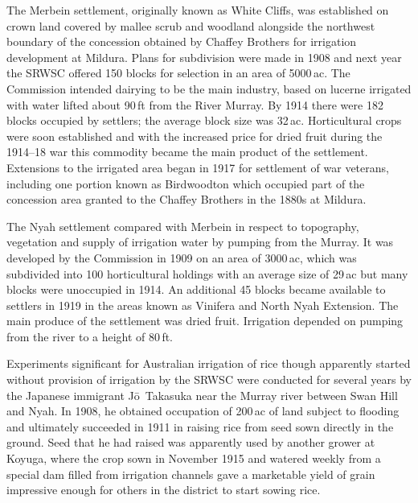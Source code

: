 The Merbein settlement, originally known as White Cliffs, was
established on crown land covered by mallee scrub and woodland
alongside the northwest boundary of the concession obtained by Chaffey
Brothers for irrigation development at Mildura.  Plans for subdivision
were made in 1908 and next year the SRWSC offered 150 blocks for
selection in an area of 5000\,ac.  The Commission intended dairying to
be the main industry, based on lucerne irrigated with water lifted
about 90\,ft from the River Murray.  By 1914 there were 182 blocks
occupied by settlers; the average block size was 32\,ac.
Horticultural crops were soon established and with the increased price
for dried fruit during the 1914--18 war this commodity became the main
product of the settlement.  Extensions to the irrigated area began in
1917 for settlement of war veterans, including one portion known as
Birdwoodton which occupied part of the concession area granted to the
Chaffey Brothers in the 1880s at Mildura.

The Nyah settlement compared with Merbein in respect to topography,
vegetation and supply of irrigation water by pumping from the Murray.
It was developed by the Commission in 1909 on an area of 3000\,ac,
which was subdivided into 100 horticultural holdings with an average
size of 29\,ac but many blocks were unoccupied in 1914. An additional
45 blocks became available to settlers in 1919 in the areas known as
Vinifera and North Nyah Extension.  The main produce of the settlement
was dried fruit.  Irrigation depended on pumping from the river to a
height of 80\,ft.

Experiments significant for Australian irrigation of rice though
apparently started without provision of irrigation by the SRWSC were
conducted for several years by the Japanese immigrant
J{\={o}}~Takasuka near the Murray river between Swan Hill and Nyah.
In 1908, he obtained occupation of 200\,ac of land subject to flooding
and ultimately succeeded in 1911 in raising rice from seed sown
directly in the ground.  Seed that he had raised was apparently used
by another grower at Koyuga, where the crop sown in November 1915 and
watered weekly from a special dam filled from irrigation channels gave
a marketable yield of grain impressive enough for others in the
district to start sowing rice.

